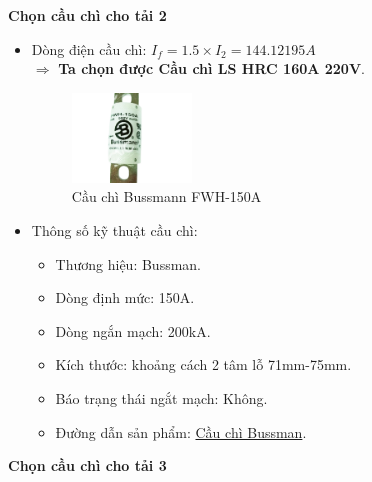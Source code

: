             \textbf{Chọn cầu chì cho tải 2}
                \begin{itemize}
                    \item Dòng điện cầu chì: $I_{f} = 1.5 \times I_{2} = 144.12195A$ \\[0.2cm]
                        $\Rightarrow$ \textbf{Ta chọn được Cầu chì LS HRC 160A 220V}.
                        \begin{figure}[H]
                            \centering
                            \includegraphics[width=0.3\textwidth]{pictures/2f.png}
                            \caption{Cầu chì Bussmann FWH-150A}
                        \end{figure}
                    \item Thông số kỹ thuật cầu chì:
                        \begin{itemize}
                            \item Thương hiệu: Bussman.
                            \item Dòng định mức: 150A.
                            \item Dòng ngắn mạch: 200kA.
                            \item Kích thước: khoảng cách 2 tâm lỗ 71mm-75mm.
                            \item Báo trạng thái ngắt mạch: Không.
                            \item Đường dẫn sản phẩm: \href{https://www.chauvinhcuong.com/cau-chi--bussmann-fwh-150a}{Cầu chì Bussman}.
                        \end{itemize}
                \end{itemize}
            \textbf{Chọn cầu chì cho tải 3}
